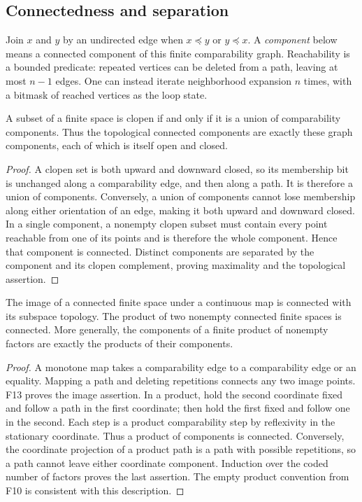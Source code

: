 \subsection{Connectedness and separation}

Join $x$ and $y$ by an undirected edge when $x\preceq y$ or
$y\preceq x$.  A \emph{component} below means a connected component
of this finite comparability graph.  Reachability is a bounded
predicate: repeated vertices can be deleted from a path, leaving
at most $n-1$ edges.  One can instead iterate neighborhood expansion
$n$ times, with a bitmask of reached vertices as the loop state.

\begin{theorem}\label{thm:finite-components}
A subset of a finite space is clopen if and only if it is a union
of comparability components.  Thus the topological connected
components are exactly these graph components, each of which is
itself open and closed.
\end{theorem}
\begin{proof}
A clopen set is both upward and downward closed, so its membership
bit is unchanged along a comparability edge, and then along a
path.  It is therefore a union of components.  Conversely, a union
of components cannot lose membership along either orientation of
an edge, making it both upward and downward closed.  In a single
component, a nonempty clopen subset must contain every point
reachable from one of its points and is therefore the whole
component.  Hence that component is connected.  Distinct
components are separated by the component and its clopen
complement, proving maximality and the topological assertion.
\end{proof}

\begin{theorem}\label{thm:finite-connected}
The image of a connected finite space under a continuous map is
connected with its subspace topology.  The product of two nonempty
connected finite spaces is connected.  More generally, the
components of a finite product of nonempty factors are exactly
the products of their components.
\end{theorem}
\begin{proof}
A monotone map takes a comparability edge to a comparability edge
or an equality.  Mapping a path and deleting repetitions connects
any two image points.  F13 proves the image assertion.
In a product, hold the second coordinate fixed and follow a path
in the first coordinate; then hold the first fixed and follow one
in the second.  Each step is a product comparability step by
reflexivity in the stationary coordinate.  Thus a product of
components is connected.  Conversely, the coordinate projection
of a product path is a path with possible repetitions, so a path
cannot leave either coordinate component.  Induction over the
coded number of factors proves the last assertion.  The empty
product convention from F10 is consistent with this description.
\end{proof}


